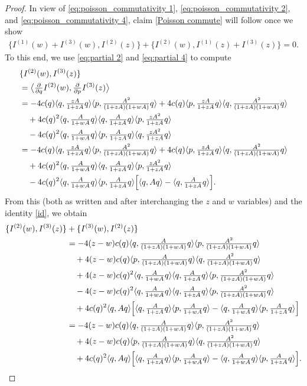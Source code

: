 \documentclass{amsart}
\theoremstyle{definition}
\numberwithin{equation}{section}
\newcommand{\la}{\langle}
\newcommand{\ra}{\rangle}
\begin{document}
\begin{proof}
In view of \eqref{eq:poisson_commutativity 1}, \eqref{eq:poisson_commutativity 2}, and \eqref{eq:poisson_commutativity 4}, claim \eqref{Poisson commute} will follow once we show
\begin{align}\label{eq:poisson_commutativity 3}
\{I^{(1)}(w)+I^{(3)}(w),I ^{(2)}(z) \} +	\{I^{(2)}(w),I ^{(1)}(z)+I ^{(3)}(z) \} =0.
\end{align}
To this end, we use \eqref{eq:partial 2} and \eqref{eq:partial 4} to compute
\begin{align*}
&\{I^{(2)}(w),I^{(3)}(z) \} \\
&= \bigl\langle \tfrac{\partial}{\partial q} I^{(2)}(w),\tfrac{\partial}{\partial p} I^{(3)}(z) \bigr\rangle\\
&=-4c(q)\la q, \tfrac{zA}{1+zA}q\ra \la p, \tfrac{A^2}{(1+z A)(1+wA)} q\ra +4c(q)\la p, \tfrac{zA}{1+zA}q\ra \la q, \tfrac{A^2}{(1+z A)(1+wA)} q\ra\\
&\quad +4 c(q)^2 \la q, \tfrac{A}{1+wA}q\ra\la q, \tfrac{A}{1+zA}q\ra\la p, \tfrac{zA^2}{1+zA}q\ra \\
&\quad-4 c(q)^2 \la q, \tfrac{A}{1+wA}q\ra\la p, \tfrac{A}{1+zA}q\ra\la q, \tfrac{zA^2}{1+zA}q\ra\\
&=-4c(q)\la q, \tfrac{zA}{1+zA}q\ra \la p, \tfrac{A^2}{(1+z A)(1+wA)} q\ra +4c(q)\la p, \tfrac{zA}{1+zA}q\ra \la q, \tfrac{A^2}{(1+z A)(1+wA)} q\ra\\
&\quad +4 c(q)^2 \la q, \tfrac{A}{1+wA}q\ra\la q, \tfrac{A}{1+zA}q\ra\la p, \tfrac{zA^2}{1+zA}q\ra \\
&\quad-4 c(q)^2 \la q, \tfrac{A}{1+wA}q\ra\la p, \tfrac{A}{1+zA}q\ra\Bigl[ \la q, Aq\ra-  \la q, \tfrac{A}{1+zA}q\ra\Bigr] .
\end{align*}
From this (both as written and after interchanging the $z$ and $w$ variables) and the identity \eqref{id}, we obtain
\begin{align}\label{441}
\{I^{(2)}(w),I ^{(3)}(z) \} & +\{I^{(3)}(w),I ^{(2)}(z) \} \notag\\
&=-4(z-w)c(q)\la q, \tfrac{A}{(1+z A)(1+wA)}q\ra \la p, \tfrac{A^2}{(1+z A)(1+wA)} q\ra\notag\\
&\quad+4(z-w)c(q)\la p, \tfrac{A}{(1+z A)(1+wA)}q\ra \la q, \tfrac{A^2}{(1+z A)(1+wA)} q\ra\notag\\
&\quad +4 (z-w) c(q)^2 \la q, \tfrac{A}{1+wA}q\ra\la q, \tfrac{A}{1+zA}q\ra\la p, \tfrac{A^2}{(1+zA)(1+wA)}q\ra\notag\\
&\quad- 4(z-w) c(q)^2 \la q, \tfrac{A}{1+wA}q\ra\la q, \tfrac{A}{1+zA}q\ra\la p, \tfrac{A^2}{(1+zA)(1+wA)}q\ra \notag\\
&\quad + 4c(q)^2 \la q,Aq\ra \Bigl[ \la q, \tfrac{A}{1+zA}q\ra \la p, \tfrac{A}{1+wA}q\ra - 
	\la q, \tfrac{A}{1+wA}q\ra \la p, \tfrac{A}{1+zA}q\ra  \Bigr] \notag\\
&=-4(z-w)c(q)\la q, \tfrac{A}{(1+z A)(1+wA)}q\ra \la p, \tfrac{A^2}{(1+z A)(1+wA)} q\ra\\
&\quad+4(z-w)c(q)\la p, \tfrac{A}{(1+z A)(1+wA)}q\ra \la q, \tfrac{A^2}{(1+z A)(1+wA)} q\ra\notag\\
&\quad + 4c(q)^2 \la q,Aq\ra \Bigl[ \la q, \tfrac{A}{1+zA}q\ra \la p, \tfrac{A}{1+wA}q\ra - 
	\la q, \tfrac{A}{1+wA}q\ra \la p, \tfrac{A}{1+zA}q\ra  \Bigr]. \notag
\end{align}



\end{proof}
\end{document}
